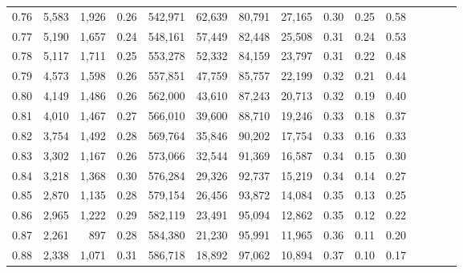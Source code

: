 \begin{tabular}{rrrcrrrrrrrrrrr}
0.76 &   5,583 &  1,926 &                                       0.26 &  542,971 &   62,639 &   80,791 &   27,165 &  0.30 &  0.25 &                         0.58 \\
0.77 &   5,190 &  1,657 &                                       0.24 &  548,161 &   57,449 &   82,448 &   25,508 &  0.31 &  0.24 &                         0.53 \\
0.78 &   5,117 &  1,711 &                                       0.25 &  553,278 &   52,332 &   84,159 &   23,797 &  0.31 &  0.22 &                         0.48 \\
0.79 &   4,573 &  1,598 &                                       0.26 &  557,851 &   47,759 &   85,757 &   22,199 &  0.32 &  0.21 &                         0.44 \\
0.80 &   4,149 &  1,486 &                                       0.26 &  562,000 &   43,610 &   87,243 &   20,713 &  0.32 &  0.19 &                         0.40 \\
0.81 &   4,010 &  1,467 &                                       0.27 &  566,010 &   39,600 &   88,710 &   19,246 &  0.33 &  0.18 &                         0.37 \\
0.82 &   3,754 &  1,492 &                                       0.28 &  569,764 &   35,846 &   90,202 &   17,754 &  0.33 &  0.16 &                         0.33 \\
0.83 &   3,302 &  1,167 &                                       0.26 &  573,066 &   32,544 &   91,369 &   16,587 &  0.34 &  0.15 &                         0.30 \\
0.84 &   3,218 &  1,368 &                                       0.30 &  576,284 &   29,326 &   92,737 &   15,219 &  0.34 &  0.14 &                         0.27 \\
0.85 &   2,870 &  1,135 &                                       0.28 &  579,154 &   26,456 &   93,872 &   14,084 &  0.35 &  0.13 &                         0.25 \\
0.86 &   2,965 &  1,222 &                                       0.29 &  582,119 &   23,491 &   95,094 &   12,862 &  0.35 &  0.12 &                         0.22 \\
0.87 &   2,261 &    897 &                                       0.28 &  584,380 &   21,230 &   95,991 &   11,965 &  0.36 &  0.11 &                         0.20 \\
0.88 &   2,338 &  1,071 &                                       0.31 &  586,718 &   18,892 &   97,062 &   10,894 &  0.37 &  0.10 &                         0.17 \\

\end{tabular}

